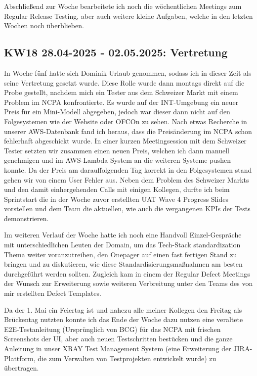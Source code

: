 Abschließend zur Woche bearbeitete ich noch die wöchentlichen Meetings zum Regular Release Testing, aber auch weitere kleine Aufgaben, welche in den letzten Wochen noch überblieben.


\subsection{KW18 28.04-2025 - 02.05.2025: Vertretung}
In Woche fünf hatte sich Dominik Urlaub genommen, sodass ich in dieser Zeit als seine Vertretung gesetzt wurde. 
Diese Rolle wurde dann montags direkt auf die Probe gestellt, nachdem mich ein Tester aus dem Schweizer Markt mit einem Problem im \ac{NCPA} konfrontierte. 
Es wurde auf der \ac{INT}-Umgebung ein neuer Preis für ein Mini-Modell abgegeben, jedoch war dieser dann nicht auf den Folgesystemen wie der Website oder \ac{OFCOn} zu sehen. 
Nach etwas Recherche in unserer \ac{AWS}-Datenbank fand ich heraus, dass die Preisänderung im \ac{NCPA} schon fehlerhaft abgeschickt wurde. 
In einer kurzen Meetingsession mit dem Schweizer Tester setzten wir zusammen einen neuen Preis, welchen ich dann manuell genehmigen und im \ac{AWS}-Lambda System an die weiteren Systeme pushen konnte. 
Da der Preis am darauffolgenden Tag korrekt in den Folgesystemen stand gehen wir von einem User Fehler aus. 
Neben dem Problem des Schweizer Markts und den damit einhergehenden Calls mit einigen Kollegen, durfte ich beim Sprintstart die in der Woche zuvor erstellten \ac{UAT} Wave 4 Progress Slides vorstellen und dem Team die aktuellen, wie auch die vergangenen KPIs der Tests demonstrieren.

Im weiteren Verlauf der Woche hatte ich noch eine Handvoll Einzel-Gespräche mit unterschiedlichen Leuten der Domain, um das Tech-Stack standardization Thema weiter voranzutreiben, den Onepager auf einen fast fertigen Stand zu bringen und zu diskutieren, wie diese Standardisierungsmaßnahmen am besten durchgeführt werden sollten. 
Zugleich kam in einem der Regular Defect Meetings der Wunsch zur Erweiterung sowie weiteren Verbreitung unter den Teams des von mir erstellten Defect Templates.

Da der 1. Mai ein Feiertag ist und nahezu alle meiner Kollegen den Freitag als Brückentag nutzten konnte ich das Ende der Woche dazu nutzen eine veraltete \ac{E2E}-Testanleitung (Ursprünglich von BCG) für das \ac{NCPA} mit frischen Screenshots der UI, aber auch neuen Testschritten bestücken und die ganze Anleitung in unser XRAY Test Management System (eine Erweiterung der JIRA-Plattform, die zum Verwalten von Testprojekten entwickelt wurde) zu übertragen.

